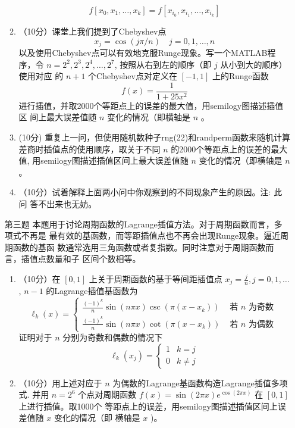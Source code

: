 \documentclass[12pt,a4paper,UTF8]{ctexart}
\theoremstyle{nonumberplain}
\begin{document}
\begin{enumerate}
\begin{enumerate}
$$
f\left[x_{0}, x_{1}, \ldots, x_{k}\right]=f\left[x_{i_{0}}, x_{i_{1}}, \ldots, x_{i_{k}}\right]
$$
\item （10分）课堂上我们提到了Chebyshev点
$$
x_{j}=\cos (j \pi / n) \quad j=0,1, \ldots, n
$$
以及使用Chebyshev点可以有效地克服Runge现象。写一个MATLAB程序，令 $n=2^{2}, 2^{3}, 2^{4}, \ldots, 2^{7}$, 按照从右到左的顺序（即 $j$ 从小到大的顺序）使用对应
的 $n+1$ 个Chebyshev点对定义在 $[-1,1]$ 上的Runge函数
$$
f(x)=\frac{1}{1+25 x^{2}}
$$
进行插值，并取2000个等距点上的误差的最大值，用semilogy图描述插值区
间上最大误差值随 $n$ 变化的情况（即横轴是 $n$ 。
\item (10分) 重复上一问，但使用随机数种子rng(22)和randperm函数来随机计算 差商时插值点的使用顺序，取关于不同 $n$ 的2000个等距点上的误差的最大值,
用semilogy图描述插值区间上最大误差值随 $n$ 变化的情况（即横轴是 $n$ 。
\item（10分）试着解释上面两小问中你观察到的不同现象产生的原因。注: 此问
答不出来也无妨。
\end{enumerate}
\item[第三题] 本题用于讨论周期函数的Lagrange插值方法。对于周期函数而言，多项式不再是 最有效的基函数，而等距插值点也不再会出现Runge现象。逼近周期函数的基函 数通常选用三角函数或者复指数。同时注意对于周期函数而言，插值点数量和子
区间个数相等。
\begin{enumerate}\item （10分）在 $[0,1]$ 上关于周期函数的基于等间距插值点 $x_{j}=\frac{j}{n}, j=0,1, \ldots$, $n-1$ 的Lagrange插值基函数为
$$
\ell_{k}(x)=\left\{\begin{array}{ll}
\frac{(-1)^{k}}{n} \sin (n \pi x) \csc \left(\pi\left(x-x_{k}\right)\right) & \text { 若 } n \text { 为奇数 } \\
\frac{(-1)^{k}}{n} \sin (n \pi x) \cot \left(\pi\left(x-x_{k}\right)\right) & \text { 若 } n \text { 为偶数 }
\end{array}\right.
$$
证明对于 $n$ 分别为奇数和偶数的情况下
$$
\ell_{k}\left(x_{j}\right)=\left\{\begin{array}{ll}
1 & k=j \\
0 & k \neq j
\end{array}\right.
$$
\item （10分）用上述对应于 $n$ 为偶数的Lagrange基函数构造Lagrange插值多项式. 并用 $n=2^{6}$ 个点对周期函数 $f(x)=\sin (2 \pi x) e^{\cos (2 \pi x)}$ 在 $[0,1]$ 上进行插值。取1000个 等距点上的误差，用semilogy图描述插值区间上误差值随 $x$ 变化的情况（即
横轴是 $x$ )。


\end{enumerate}
\end{enumerate}
\end{document}
